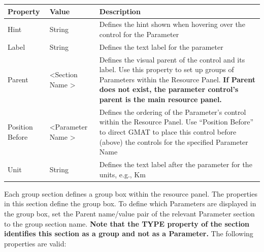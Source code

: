 \documentclass[10pt,letterpaper]{article}
\begin{document}
\begin{center}
\begin{tabular}{|l|l|p{3.5in}|}
\hline 
\textbf{Property} & \textbf{Value} & \textbf{Description} \\ 
\hline 
Hint & String & Defines the hint shown when hovering over the control for the Parameter \\ 
\hline 
Label & String & Defines the text label for the parameter \\ 
\hline 
Parent & \textless Section Name \textgreater & Defines the visual parent of the control and its label.  Use this property to set up groups of Parameters within the Resource Panel.  \textbf{If Parent does not exist, the parameter control's parent is the main resource panel.} \\ 
\hline 
Position Before & \textless Parameter Name \textgreater & Defines the ordering of the Parameter's control within the Resource Panel.  Use ``Position Before'' to direct GMAT to place this control before (above) the controls for the specified Parameter Name \\ 
\hline 
Unit & String & Defines the text label after the parameter for the units, e.g., Km \\ 
\hline 
\end{tabular} 
\end{center}

Each group section defines a group box within the resource panel.  The properties in this section define the group box.  To define which Parameters are displayed in the group box, set the Parent name/value pair of the relevant Parameter section to the group section name.  \textbf{Note that the TYPE property of the section identifies this section as a group and not as a Parameter.}  The following properties are valid:
\end{document}
